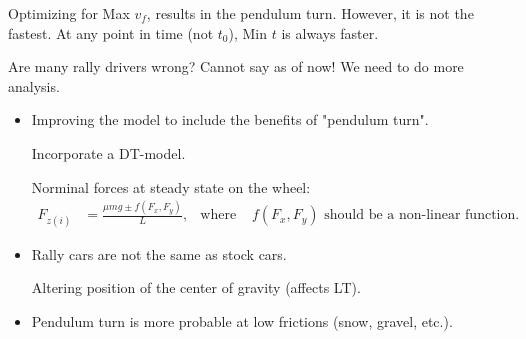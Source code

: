 \begin{frame}{}

    \begin{block}{}
        Optimizing for Max $v_f$, results in the pendulum turn. \newline However, it is not the fastest. At any point in time (not $t_0$), Min $t$ is always faster.
    \end{block}
    \pause
    \begin{exampleblock}{Are many rally drivers wrong?}
        Cannot say as of now! We need to do more analysis.
    \end{exampleblock}

    \pause
    \begin{itemize}
        \item Improving the model to include the benefits of "pendulum turn". \par Incorporate a DT-model. \par Norminal forces at steady state on the wheel: \begin{align*}
            F_{z(i)} &= \frac{\mu m g \pm f(F_{x},F_y)}{L}, & \text{where }&  f(F_{x},F_y) \text{ should be a non-linear function.}
        \end{align*} \pause
        \item Rally cars are not the same as stock cars. \par Altering position of the center of gravity (affects LT). \pause
        \item Pendulum turn is more probable at low frictions (snow, gravel, etc.). 
    \end{itemize}    
\end{frame} 